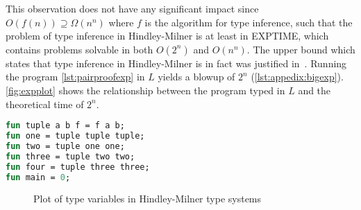 This observation does not have any significant impact since $O(f(n)) \supseteq \Omega(n^n)$ where $f$ is the algorithm for type inference, such that the problem of type inference in Hindley-Milner is at least in EXPTIME, which contains problems solvable in both $O(2^n)$ and $O(n^n)$.
The upper bound which states that type inference in Hindley-Milner is in fact  was justified in~\cite{kfoury1990ml,mairson1989deciding}.
Running the program \autoref{lst:pairproofexp} in $L$ yields a blowup of $2^n$ (\autoref{lst:appedix:bigexp}).
\autoref{fig:expplot} shows the relationship between the program typed in $L$ and the theoretical time of $2^n$.
\begin{lstlisting}[language=ML,caption={Nested tuples with different type variables},label={lst:pairproofexp},mathescape=true]
fun tuple a b f = f a b;
fun one = tuple tuple tuple;
fun two = tuple one one;
fun three = tuple two two;
fun four = tuple three three;
fun main = 0;
\end{lstlisting}
\begin{figure}[ht]
    \centering
{}
    \caption{Plot of type variables in Hindley-Milner type systems}
    \label{fig:expplot}
\end{figure}

